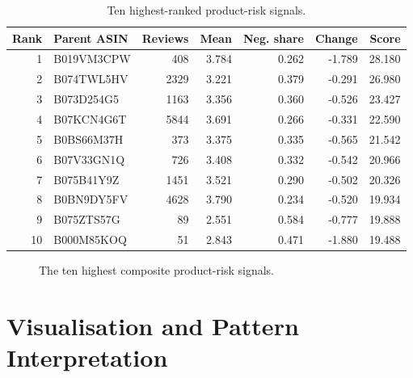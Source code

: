\documentclass[10pt,a4paper]{article}
\begin{document}
\begin{table}[H]
\centering\scriptsize
\caption{Ten highest-ranked product-risk signals.}
\begin{tabular}{@{}rlrrrrr@{}}\toprule
Rank & Parent ASIN & Reviews & Mean & Neg. share & Change & Score \\\midrule
1 & B019VM3CPW & 408 & 3.784 & 0.262 & -1.789 & 28.180 \\
2 & B074TWL5HV & 2329 & 3.221 & 0.379 & -0.291 & 26.980 \\
3 & B073D254G5 & 1163 & 3.356 & 0.360 & -0.526 & 23.427 \\
4 & B07KCN4G6T & 5844 & 3.691 & 0.266 & -0.331 & 22.590 \\
5 & B0BS66M37H & 373 & 3.375 & 0.335 & -0.565 & 21.542 \\
6 & B07V33GN1Q & 726 & 3.408 & 0.332 & -0.542 & 20.966 \\
7 & B075B41Y9Z & 1451 & 3.521 & 0.290 & -0.502 & 20.326 \\
8 & B0BN9DY5FV & 4628 & 3.790 & 0.234 & -0.520 & 19.934 \\
9 & B075ZTS57G & 89 & 2.551 & 0.584 & -0.777 & 19.888 \\
10 & B000M85KOQ & 51 & 2.843 & 0.471 & -1.880 & 19.488 \\\bottomrule
\end{tabular}
\end{table}

\begin{figure}[H]
\centering
{}
\caption{The ten highest composite product-risk signals.}
\end{figure}

\newpage
\section{Visualisation and Pattern Interpretation}
\end{document}
